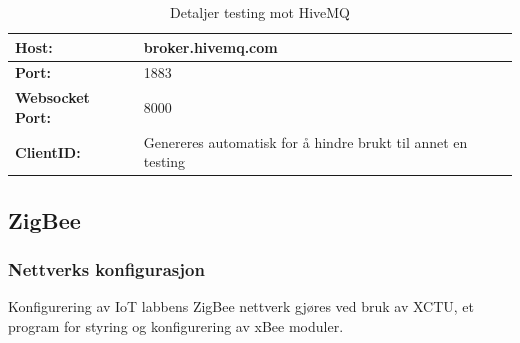 \documentclass{article}
\begin{document}
\begin{table}[h!]
	\centering
	\caption{Detaljer testing mot HiveMQ}
	\label{HiveMQ}
	\begin{tabular}{|l|l|}
		\hline
		\textbf{Host:}  & broker.hivemq.com \\ \hline
		\textbf{Port:}  &  1883\\ \hline
		\textbf{Websocket Port: }& 8000 \\ \hline
		\textbf{ClientID: } & Genereres automatisk for å hindre brukt til annet en testing \\ \hline
	\end{tabular}
\end{table}


\subsection{ZigBee}

\subsubsection{Nettverks konfigurasjon}
Konfigurering av IoT labbens ZigBee nettverk gjøres ved bruk av XCTU, et program for styring og konfigurering av xBee moduler. 
\end{document}
